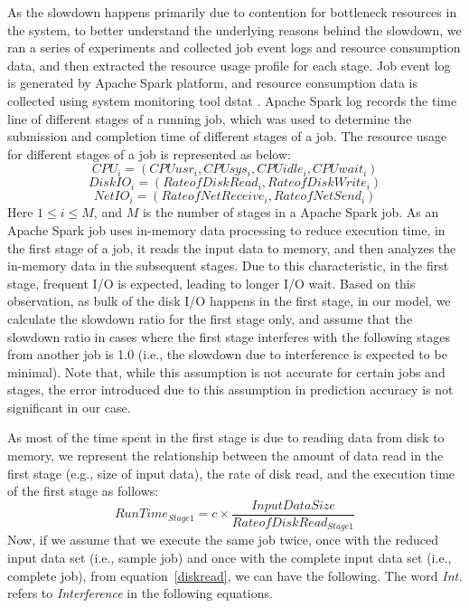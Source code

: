 \noindent
As the slowdown happens primarily due to contention for bottleneck resources in the system, to better understand the underlying reasons behind the slowdown, we ran a series of experiments and collected job event logs and resource consumption data, and then extracted the resource usage profile for each stage. Job event log is generated by Apache Spark platform, and resource consumption data is collected using system monitoring tool dstat \cite{dstat}. Apache Spark log records the time line of different stages of a running job, which was used to determine the submission and completion time of different stages of a job. The resource usage for different stages of a job is represented as below: 
\begin{equation}
\label{cpu}
CPU_i 
= (CPUusr_i, CPUsys_i, CPUidle_i, CPUwait_i) 
\end{equation}
\begin{equation}
\label{diskio}
DiskIO_i = (RateofDiskRead_i, RateofDiskWrite_i)
\end{equation}
\begin{equation}
\label{netio}
NetIO_i = (RateofNetReceive_i, RateofNetSend_i)
\end{equation}
Here $1 \leq i \leq M$, and $M$ is the number of stages in a Apache Spark job.
\noindent 
As an Apache Spark job uses in-memory data processing to reduce execution time, in the first stage of a job, it reads the input data to memory, and then analyzes the in-memory data in the subsequent stages. Due to this characteristic, in the first stage, frequent I/O is expected, leading to longer I/O wait. Based on this observation, as bulk of the disk I/O happens in the first stage, in our model, we calculate the slowdown ratio for the first stage only, and assume that the slowdown ratio in cases where the first stage interferes with the following stages from another job is 1.0 (i.e., the slowdown due to interference is expected to be minimal). Note that, while this assumption is not accurate for certain jobs and stages, the error introduced due to this assumption in prediction accuracy is not significant in our case. 




\noindent 
As most of the time spent in the first stage is due to reading data from disk to memory, we represent the relationship between the amount of data read in the first stage (e.g., size of input data), the rate of disk read, and the execution time of the first stage as follows: 
\begin{equation}
\label{diskread}
RunTime_{Stage 1}=c \times \frac{Input Data Size}{Rate of DiskRead_{Stage 1}} \end{equation}
\noindent 
Now, if we assume that we execute the same job twice, once with the reduced input data set (i.e., sample job) and once with the complete input data set (i.e., complete job), from equation~\ref{diskread}, we can have the following. The word {\textit{Int.}} refers to {\textit{Interference}} in the following equations. 


